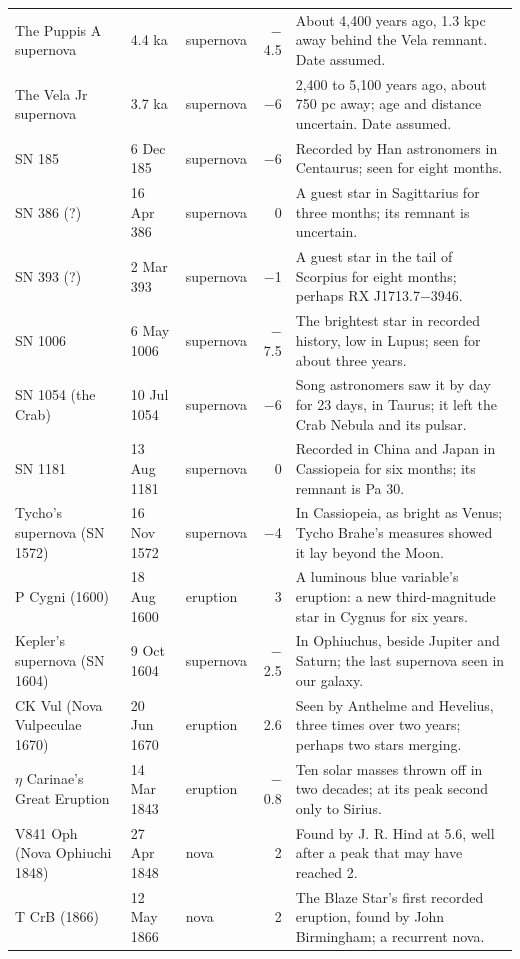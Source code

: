 \documentclass[9pt,twocolumn]{extarticle}
\begin{document}
\begin{table}[tp]
\begin{tabularx}{\textwidth}{@{}p{3.6cm}p{1.6cm}lrY@{}}
The Puppis A supernova & 4.4 ka & supernova & $-$4.5 & About 4,400 years ago, 1.3 kpc away behind the Vela remnant. Date assumed. \\
The Vela Jr supernova & 3.7 ka & supernova & $-$6 & 2,400 to 5,100 years ago, about 750 pc away; age and distance uncertain. Date assumed. \\
SN 185 & 6 Dec 185 & supernova & $-$6 & Recorded by Han astronomers in Centaurus; seen for eight months. \\
SN 386 (?) & 16 Apr 386 & supernova & 0 & A guest star in Sagittarius for three months; its remnant is uncertain. \\
SN 393 (?) & 2 Mar 393 & supernova & $-$1 & A guest star in the tail of Scorpius for eight months; perhaps RX J1713.7$-$3946. \\
SN 1006 & 6 May 1006 & supernova & $-$7.5 & The brightest star in recorded history, low in Lupus; seen for about three years. \\
SN 1054 (the Crab) & 10 Jul 1054 & supernova & $-$6 & Song astronomers saw it by day for 23 days, in Taurus; it left the Crab Nebula and its pulsar. \\
SN 1181 & 13 Aug 1181 & supernova & 0 & Recorded in China and Japan in Cassiopeia for six months; its remnant is Pa 30. \\
Tycho's supernova (SN 1572) & 16 Nov 1572 & supernova & $-$4 & In Cassiopeia, as bright as Venus; Tycho Brahe's measures showed it lay beyond the Moon. \\
P Cygni (1600) & 18 Aug 1600 & eruption & 3 & A luminous blue variable's eruption: a new third-magnitude star in Cygnus for six years. \\
Kepler's supernova (SN 1604) & 9 Oct 1604 & supernova & $-$2.5 & In Ophiuchus, beside Jupiter and Saturn; the last supernova seen in our galaxy. \\
CK Vul (Nova Vulpeculae 1670) & 20 Jun 1670 & eruption & 2.6 & Seen by Anthelme and Hevelius, three times over two years; perhaps two stars merging. \\
$\eta$ Carinae's Great Eruption & 14 Mar 1843 & eruption & $-$0.8 & Ten solar masses thrown off in two decades; at its peak second only to Sirius. \\
V841 Oph (Nova Ophiuchi 1848) & 27 Apr 1848 & nova & 2 & Found by J. R. Hind at 5.6, well after a peak that may have reached 2. \\
T CrB (1866) & 12 May 1866 & nova & 2 & The Blaze Star's first recorded eruption, found by John Birmingham; a recurrent nova. \\

\end{tabularx}
\end{table}
\end{document}
